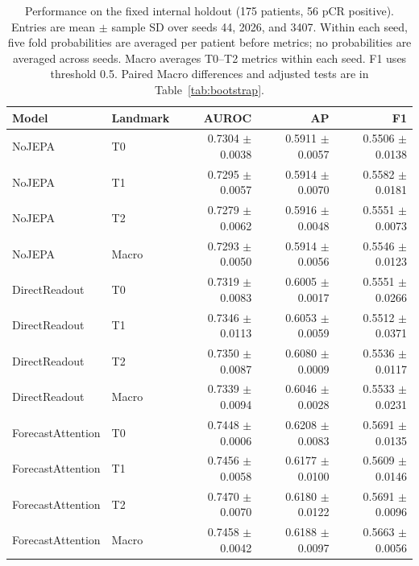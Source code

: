 \begin{table}[t]
\centering
\small
\caption{Performance on the fixed internal holdout (175 patients, 56 pCR positive). Entries are mean $\pm$ sample SD over seeds 44, 2026, and 3407. Within each seed, five fold probabilities are averaged per patient before metrics; no probabilities are averaged across seeds. Macro averages T0--T2 metrics within each seed. F1 uses threshold 0.5. Paired Macro differences and adjusted tests are in Table~\ref{tab:bootstrap}.}
\label{tab:main}
\begin{tabular}{llrrr}
\toprule
Model & Landmark & AUROC & AP & F1 \\
\midrule
NoJEPA & T0 & 0.7304 $\pm$ 0.0038 & 0.5911 $\pm$ 0.0057 & 0.5506 $\pm$ 0.0138 \\
NoJEPA & T1 & 0.7295 $\pm$ 0.0057 & 0.5914 $\pm$ 0.0070 & 0.5582 $\pm$ 0.0181 \\
NoJEPA & T2 & 0.7279 $\pm$ 0.0062 & 0.5916 $\pm$ 0.0048 & 0.5551 $\pm$ 0.0073 \\
NoJEPA & Macro & 0.7293 $\pm$ 0.0050 & 0.5914 $\pm$ 0.0056 & 0.5546 $\pm$ 0.0123 \\
DirectReadout & T0 & 0.7319 $\pm$ 0.0083 & 0.6005 $\pm$ 0.0017 & 0.5551 $\pm$ 0.0266 \\
DirectReadout & T1 & 0.7346 $\pm$ 0.0113 & 0.6053 $\pm$ 0.0059 & 0.5512 $\pm$ 0.0371 \\
DirectReadout & T2 & 0.7350 $\pm$ 0.0087 & 0.6080 $\pm$ 0.0009 & 0.5536 $\pm$ 0.0117 \\
DirectReadout & Macro & 0.7339 $\pm$ 0.0094 & 0.6046 $\pm$ 0.0028 & 0.5533 $\pm$ 0.0231 \\
ForecastAttention & T0 & 0.7448 $\pm$ 0.0006 & 0.6208 $\pm$ 0.0083 & 0.5691 $\pm$ 0.0135 \\
ForecastAttention & T1 & 0.7456 $\pm$ 0.0058 & 0.6177 $\pm$ 0.0100 & 0.5609 $\pm$ 0.0146 \\
ForecastAttention & T2 & 0.7470 $\pm$ 0.0070 & 0.6180 $\pm$ 0.0122 & 0.5691 $\pm$ 0.0096 \\
ForecastAttention & Macro & 0.7458 $\pm$ 0.0042 & 0.6188 $\pm$ 0.0097 & 0.5663 $\pm$ 0.0056 \\
\bottomrule
\end{tabular}
\end{table}

